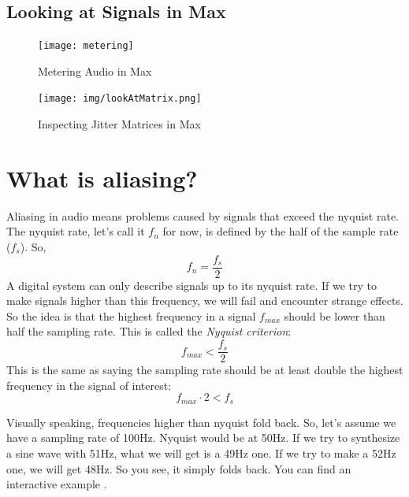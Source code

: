 \subsection{Looking at Signals in Max}
\begin{figure}[H]
	\centering
	\texttt{[image: metering]}
	\caption[metering]
	{Metering Audio in Max}
	\label{fig:meteringAudio}
\end{figure}


\begin{figure}[H]
	\centering
	\texttt{[image: img/lookAtMatrix.png]}
	\caption[metering]
	{Inspecting Jitter Matrices in Max}
	\label{fig:matrixIns[ection]}
\end{figure}



\section{What is aliasing?}
Aliasing in audio means problems caused by signals that exceed the nyquist rate.\\
The nyquist rate, let's call it $f_n$ for now, is defined by the half of the sample rate ($f_s$). So,
\begin{equation}
	f_n=\frac{f_s}{2}
\end{equation}
A digital system can only describe signals up to its nyquist rate. If we try to make signals higher than this frequency, we will fail and encounter strange effects. So the idea is that the highest frequency in a signal $f_{max}$ should be lower than half the sampling rate. This is called the \textit{Nyquist criterion}:\\
\begin{equation}
f_{max} < \frac{f_s}{2} 
\end{equation}
This is the same as saying the sampling rate should be at least double the highest frequency in the signal of interest:
\begin{equation}
f_{max}\cdot2 < f_s 
\end{equation}

Visually speaking, frequencies higher than nyquist fold back. So, let's assume we have a sampling rate of 100Hz. Nyquist would be at 50Hz. If we try to synthesize a sine wave with 51Hz, what we will get is a 49Hz one. If we try to make a 52Hz one, we will get 48Hz. So you see, it simply folds back. You can find an interactive example .

